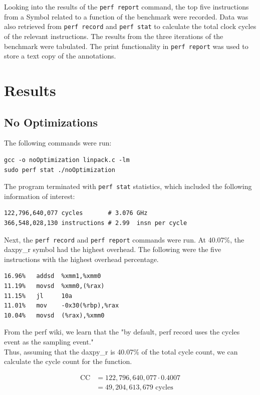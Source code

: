 \documentclass[twocolumn]{article}
\newcommand{\cc}[1]{\texttt{#1}}
\begin{document}
Looking into the results of the \cc{perf report} command, the top five instructions from a Symbol related to a function of the benchmark were recorded. Data was also retrieved from \cc{perf record} and \cc{perf stat} to calculate the total clock cycles of the relevant instructions. The results from the three iterations of the benchmark were tabulated. The print functionality in \cc{perf report} was used to store a text copy of the annotations. 

\section{Results}

\subsection{No Optimizations}

The following commands were run: 
\begin{verbatim}
gcc -o noOptimization linpack.c -lm
sudo perf stat ./noOptimization 
\end{verbatim}

The program terminated with \cc{perf stat} statistics, which included the following information of interest:

\begin{verbatim}
122,796,640,077 cycles       # 3.076 GHz                    
366,548,028,130 instructions # 2.99  insn per cycle 
\end{verbatim}


Next, the \cc{perf record} and \cc{perf report} commands were run. At 40.07\%, the daxpy\_r symbol had the highest overhead. The following were the five instructions with the highest overhead percentage. 

\begin{verbatim}
16.96%   addsd  %xmm1,%xmm0
11.19%   movsd  %xmm0,(%rax)
11.15%   jl     10a
11.01%   mov    -0x30(%rbp),%rax
10.04%   movsd  (%rax),%xmm0
\end{verbatim}

From the perf wiki, we learn that the "by default, perf record uses the cycles event as the sampling event." \cite{perfwiki} \\

Thus, assuming that the daxpy\_r is 40.07\% of the total cycle count, we can calculate the cycle count for the function.

\begin{equation}
    \begin{split}
        \text{CC} & = 122,796,640,077 \cdot 0.4007  \\ 
        & = 49,204,613,679 \text{ cycles}\\
    \end{split}
    \label{eq:noOpFuncCalc}
\end{equation}
\end{document}
